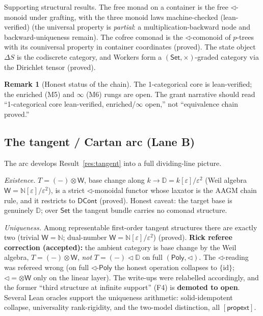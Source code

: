 \documentclass[11pt]{article}
\theoremstyle{definition}
\newtheorem{remark}[theorem]{Remark}
\newcommand{\Poly}{\mathsf{Poly}}
\newcommand{\DCont}{\mathsf{DCont}}
\newcommand{\Set}{\mathsf{Set}}
\newcommand{\N}{\mathbb{N}}
\newcommand{\DD}{\mathbb{D}}
\newcommand{\W}{\mathsf{W}}
\newcommand{\grade}[1]{{\small\textsf{(#1)}}}
\begin{document}
Supporting structural results. The free monad on a container is the free $\lhd$-monoid under
grafting, with the three monoid laws machine-checked \grade{lean-verified} (the universal
property is \emph{partial}: a multiplication-backward node and backward-uniqueness remain). The
cofree comonad is the $\lhd$-comonoid of $p$-trees with its couniversal property in container
coordinates \grade{proved}. The state object $\Delta S$ is the codiscrete category, and Workers
form a $(\Set,\times)$-graded category via the Dirichlet tensor \grade{proved}.

\begin{remark}[Honest status of the chain]
The 1-categorical core is lean-verified; the enriched (M5) and $\infty$ (M6) rungs are open.
The grant narrative should read ``1-categorical core lean-verified, enriched/$\infty$ open,''
not ``equivalence chain proved.''
\end{remark}

\subsection{The tangent / Cartan arc (Lane B)}

The arc develops Result~\ref{res:tangent} into a full dividing-line picture.

\emph{Existence.} $T = (-)\otimes\W$, base change along $k \to \DD = k[\varepsilon]/\varepsilon^2$
(Weil algebra $\W = \N[\varepsilon]/\varepsilon^2$), is a strict $\lhd$-monoidal functor whose
laxator is the AAGM chain rule, and it restricts to $\DCont$ \grade{proved}. Honest caveat: the
target base is genuinely $\DD$; over $\Set$ the tangent bundle carries no comonad structure.

\emph{Uniqueness.} Among representable first-order tangent structures there are exactly two
(trivial $\W=\N$; dual-number $\W=\N[\varepsilon]/\varepsilon^2$) \grade{proved}. \textbf{Rick
referee correction (accepted):} the ambient category is base change by the Weil algebra,
$T = (-)\otimes\W$, \emph{not} $T = (-)\lhd\DD$ on full $(\Poly,\lhd)$. The $\lhd$-reading was
refereed wrong (on full $\lhd$-$\Poly$ the honest operation collapses to $\{\mathrm{id}\}$;
$\lhd = \otimes\W$ only on the linear layer). The write-ups were relabelled accordingly, and the
former ``third structure at infinite support'' (F4) is \textbf{demoted to open}. Several
Lean oracles support the uniqueness arithmetic: solid-idempotent collapse, universality
rank-rigidity, and the two-model distinction, all $[\textsf{propext}]$.
\end{document}
